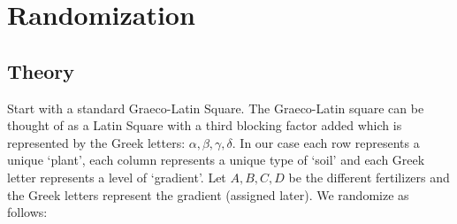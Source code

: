 \documentclass{article}
\begin{document}
\section{Randomization}
\subsection{Theory}
Start with a standard Graeco-Latin Square. The Graeco-Latin square can be thought of as a Latin Square with a third blocking factor added which is represented by the Greek letters: $\alpha, \beta, \gamma, \delta$. In our case each row represents a unique ‘plant’, each column represents a unique type of ‘soil’ and each Greek letter represents a level of ‘gradient’. Let $A, B, C, D$ be the different fertilizers and the Greek letters represent the gradient (assigned later). We randomize as follows:
\end{document}
